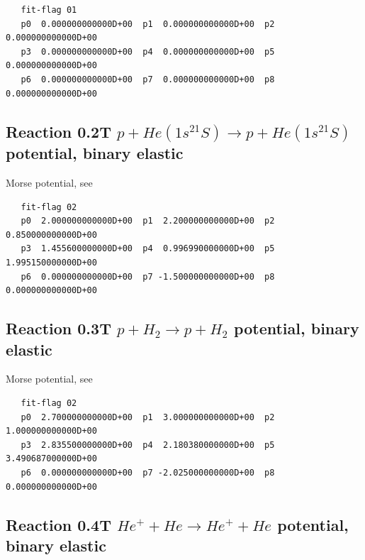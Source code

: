 \documentclass[12pt,dvipdfmx]{article}
\begin{document}
\begin{small}\begin{verbatim}
   fit-flag 01
   p0  0.000000000000D+00  p1  0.000000000000D+00  p2  0.000000000000D+00
   p3  0.000000000000D+00  p4  0.000000000000D+00  p5  0.000000000000D+00
   p6  0.000000000000D+00  p7  0.000000000000D+00  p8  0.000000000000D+00
\end{verbatim}\end{small}


\newpage

\subsection{
Reaction 0.2T   $ p + He(1s^21S) \rightarrow p + He(1s^21S) $
potential, binary elastic}

Morse potential, see \cite{kn:Bachmann}

\begin{small}\begin{verbatim}
   fit-flag 02
   p0  2.000000000000D+00  p1  2.200000000000D+00  p2  0.850000000000D+00
   p3  1.455600000000D+00  p4  0.996990000000D+00  p5  1.995150000000D+00
   p6  0.000000000000D+00  p7 -1.500000000000D+00  p8  0.000000000000D+00
\end{verbatim}\end{small}


\newpage

\subsection{
Reaction 0.3T    $p + H_2 \rightarrow p + H_2 $ potential, binary elastic
}

Morse potential, see \cite{kn:Bachmann}

\begin{small}\begin{verbatim}
   fit-flag 02
   p0  2.700000000000D+00  p1  3.000000000000D+00  p2  1.000000000000D+00
   p3  2.835500000000D+00  p4  2.180380000000D+00  p5  3.490687000000D+00
   p6  0.000000000000D+00  p7 -2.025000000000D+00  p8  0.000000000000D+00
\end{verbatim}\end{small}


\newpage

\subsection{
Reaction 0.4T   $  He^+ + He \rightarrow He^+ + He $ potential, binary elastic
}
\end{document}
